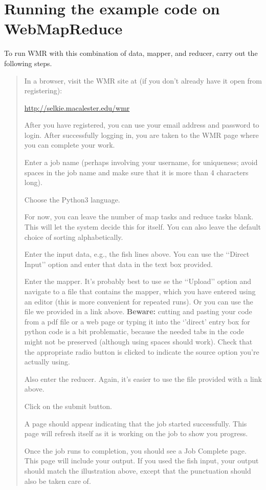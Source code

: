 \documentclass[letterpaper,10pt,openany,oneside]{sphinxmanual}
\begin{document}
\section{Running the example code on WebMapReduce}
\label{wmr_py/wmr_py:running-the-example-code-on-webmapreduce}
To run WMR with this combination of data, mapper, and reducer,
carry out the following steps.
\begin{quote}

In a browser, visit the WMR site at (if you don't already have it
open from registering):

\href{http://selkie.macalester.edu/wmr}{http://selkie.macalester.edu/wmr}

After you have registered, you can use your email address and
password to login. After successfully logging in, you are taken to
the WMR page where you can complete your work.

Enter a job name (perhaps involving your username, for uniqueness;
avoid spaces in the job name and make sure that it is more than 4
characters long).

Choose the Python3 language.

For now, you can leave the number of map tasks and reduce tasks
blank. This will let the system decide this for itself. You can
also leave the default choice of sorting alphabetically.

Enter the input data, e.g., the fish lines above. You can use the
{}`{}`Direct Input'' option and enter that data in the text box
provided.

Enter the mapper. It's probably best to use se the {}`{}`Upload''
option and navigate to a file that contains the mapper, which you
have entered using an editor (this is more convenient for repeated
runs). Or you can use the file we provided in a link above.
\textbf{Beware:} cutting and pasting your code from a pdf file or
a web page or typing it into the {}`'direct' entry box for python
code is a bit problematic, because the needed tabs in the code
might not be preserved (although using spaces should work). Check
that the appropriate radio button is clicked to indicate the source
option you're actually using.

Also enter the reducer.  Again, it's easier to use the file provided
with a link above.

Click on the submit button.

A page should appear indicating that the job started successfully.
This page will refresh itself as it is working on the job to show
you progress.

Once the job runs to completion, you should see a Job Complete page.
This page will include your output. If you used the fish input,
your output should match the illustration above, except that the
punctuation should also be taken care of.
\end{quote}
\end{document}
